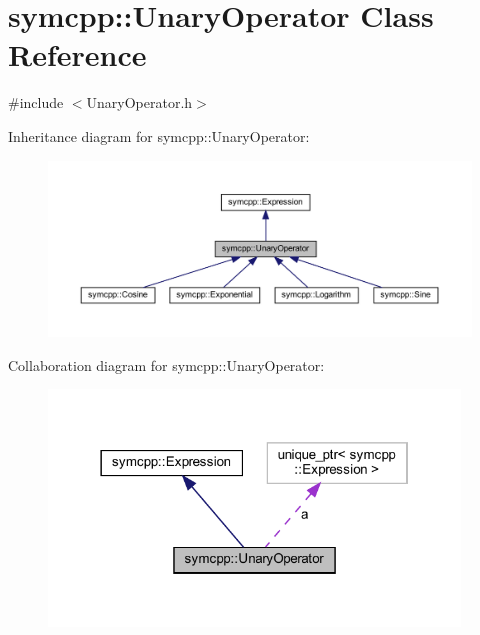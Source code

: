 \hypertarget{classsymcpp_1_1UnaryOperator}{}\section{symcpp\+::Unary\+Operator Class Reference}
\label{classsymcpp_1_1UnaryOperator}


{\ttfamily \#include $<$Unary\+Operator.\+h$>$}



Inheritance diagram for symcpp\+::Unary\+Operator\+:
\nopagebreak
\begin{figure}[H]
\begin{center}
\leavevmode
\includegraphics[width=350pt]{classsymcpp_1_1UnaryOperator__inherit__graph}
\end{center}
\end{figure}


Collaboration diagram for symcpp\+::Unary\+Operator\+:
\nopagebreak
\begin{figure}[H]
\begin{center}
\leavevmode
\includegraphics[width=310pt]{classsymcpp_1_1UnaryOperator__coll__graph}
\end{center}
\end{figure}
